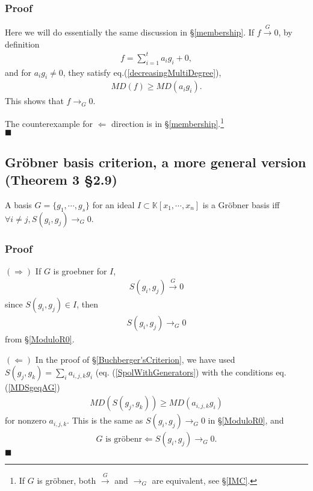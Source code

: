 \documentclass[11pt]{book}
\begin{document}
\subsubsection{Proof}
Here we will do essentially the same discussion in \S\ref{membership}.
If $f \stackrel{G}{\to} 0$, by definition
\begin{eqnarray}
f = \sum_{i=1}^t a_i g_i + 0,
\end{eqnarray}
and for $a_i g_i \neq 0$, they satisfy eq.(\ref{decreasingMultiDegree}),
\begin{eqnarray}
MD(f) \geq MD(a_i g_i).
\end{eqnarray}
This shows that $f \to_G 0$.

The counterexample for $\Leftarrow$ direction is in \S\ref{membership}.\footnote{If $G$ is gr\"obner, both $\stackrel{G}{\to}$ and $\to_G$ are equivalent, see \S\ref{IMC}.}
\\
$\blacksquare$

\subsection{Gr\"obner basis criterion, a more general version (Theorem 3 \S2.9)}
\label{efficientGCriterion}
A basis $G = \{g_1, \cdots, g_s\}$ for an ideal $I \subset \mathbb{K}[x_1, \cdots, x_n]$ is a Gr\"obner basis iff $\forall i \neq j, S(g_i, g_j) \to_G 0$.

\subsubsection{Proof}
$(\Rightarrow)$ If $G$ is groebner for $I$,
\begin{eqnarray}
S(g_i, g_j) \stackrel{G}{\to} 0
\end{eqnarray}
since $S(g_i, g_j) \in I$, then 
\begin{eqnarray}
S(g_i, g_j) \to_G 0
\end{eqnarray}
from \S\ref{ModuloR0}.

$(\Leftarrow)$
In the proof of \S\ref{Buchberger'sCriterion}, we have used $S(g_j, g_k) = \sum_{i} a_{i,j,k} g_i $ (eq. (\ref{SpolWithGenerators}) with the conditions eq.(\ref{MDSgeqAG})
\begin{eqnarray}
MD\left(S(g_j, g_k) \right) \geq MD( a_{i,j,k} g_i)
\end{eqnarray}
for nonzero $a_{i,j,k}$.
This is the same as $S(g_i, g_j) \to_G 0$ in \S\ref{ModuloR0}, and
\begin{eqnarray}
G \text{ is gr\"obenr} \Leftarrow S(g_i, g_j) \to_G 0.
\end{eqnarray}
$\blacksquare$
\end{document}
